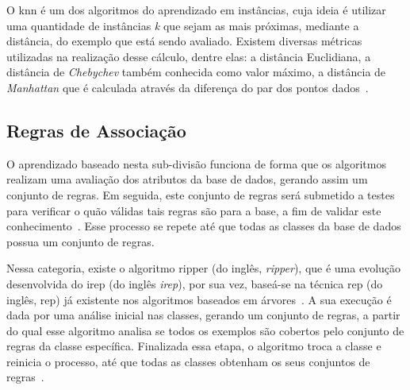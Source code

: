         O \ac{knn} é um dos algoritmos do aprendizado em instâncias, cuja ideia é utilizar uma quantidade de instâncias \textit{k} que sejam as mais próximas, mediante a distância, do exemplo que está sendo avaliado. Existem diversas métricas utilizadas na realização desse cálculo, dentre elas: a distância Euclidiana, a distância de \textit{Chebychev} também conhecida como valor máximo, a distância de \textit{Manhattan} que é calculada através da diferença do par dos pontos dados~\cite{aha1991, mulak2015analysis}.

    \subsection{Regras de Associação}
        \label{subsec:association-rules}
        O aprendizado baseado nesta sub\hyp{divisão} funciona de forma que os algoritmos realizam uma avaliação dos atributos da base de dados, gerando assim um conjunto de regras. Em seguida, este conjunto de regras será submetido a testes para verificar o quão válidas tais regras são para a base, a fim de validar este conhecimento~\cite{gollapudi2016practical}. Esse processo se repete até que todas as classes da base de dados possua um conjunto de regras.
        
        Nessa categoria, existe o algoritmo \acs{ripper} (do inglês, \textit{\acl{ripper}}), que é uma evolução desenvolvida do \acs{irep} (do inglês \textit{\acl{irep}}), por sua vez, baseá\hyp{se} na técnica \acs{rep} (do inglês, \acl{rep}) já existente nos algoritmos baseados em árvores~\cite{cohen1995ripper}. A sua execução é dada por uma análise inicial nas classes, gerando um conjunto de regras, a partir do qual esse algoritmo analisa se todos os exemplos são cobertos pelo conjunto de regras da classe específica. Finalizada essa etapa, o algoritmo troca a classe e reinicia o processo, até que todas as classes obtenham os seus conjuntos de regras~\cite{rajput2011j48}.
